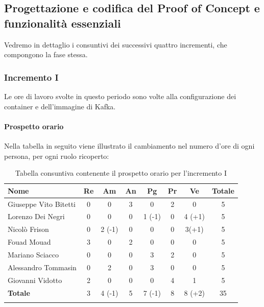 		\subsection{Progettazione e codifica del Proof of Concept e funzionalità essenziali}
		Vedremo in dettaglio i consuntivi dei successivi quattro incrementi, che compongono la fase stessa.  	
			
		\subsubsection{Incremento I}
		Le ore di lavoro svolte in questo periodo sono volte alla configurazione dei container e dell'immagine  di Kafka. 
		\paragraph{Prospetto orario}
			Nella tabella in seguito viene illustrato il cambiamento nel numero d'ore di ogni persona, per ogni ruolo ricoperto:
			
			\begin{longtable}{|l|c|c|c|c|c|c|c|}
				\hline
				\rowcolor{lighter-grayer}
				\textbf{Nome} & \textbf{Re} & \textbf{Am} & \textbf{An} & \textbf{Pg}  & \textbf{Pr}   & \textbf{Ve} & \textbf{Totale} \\
				\hline
				\endfirsthead
				\hline
				Giuseppe Vito Bitetti & 0 & 0 & 3 & 0 & 2 & 0 & 5\\
				\hline
				\hline
				Lorenzo Dei Negri & 0 & 0 & 0 & 1 (-1) & 0 & 4 (+1) & 5\\
				\hline
				\hline
				Nicolò Frison & 0 & 2 (-1) & 0 & 0 & 0 & 3(+1) & 5\\
				\hline
				\hline
				Fouad Mouad & 3 & 0 & 2 & 0 & 0 & 0 & 5\\
				\hline
				\hline
				Mariano Sciacco & 0 & 0 & 0 & 3 & 2 & 0 & 5\\
				\hline
				\hline
				Alessandro Tommasin & 0 & 2 & 0 & 3 & 0 & 0 & 5\\
				\hline
				\hline
				Giovanni Vidotto & 2 & 0 & 0 & 0 & 4 & 1 & 5\\
				\hline 
				\textbf{Totale} & 3 &  4 (-1) & 5 & 7 (-1) & 8 & 8 (+2) & 35\\
				\hline 
				
				\caption{Tabella consuntiva contenente il prospetto orario per l'incremento I}
			\end{longtable}
			\pagebreak
			
